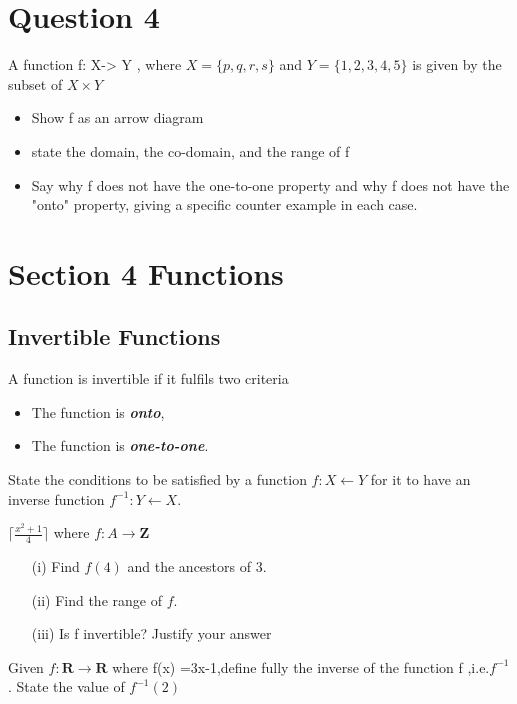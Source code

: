 \documentclass[]{report}
\begin{document}
\begin{enumerate}
\section*{Question 4}

A function f: X-> Y , where $X = \{p,q,r,s\}$ and $Y =\{1,2,3,4,5\}$
is given by the subset of $X \times Y$


\begin{itemize}
\item Show f as an arrow diagram
\item state the domain, the co-domain, and the range of f
\item Say why f does not have the one-to-one property and why f does 
not have the "onto" property, giving a specific counter example in each case.
\end{itemize}


\section{Section 4 Functions}

\subsection{Invertible Functions}
A function is invertible if it fulfils two criteria
\begin{itemize}
\item The function is \textbf{\textit{onto}},
\item The function is \textbf{\textit{one-to-one}}.
\end{itemize}

State the conditions to be satisfied by a function
$f : X \leftarrow Y$ for it to have an inverse function
$f^{-1} : Y \leftarrow X$.

$\lceil \frac{x^2+1}{4} \rceil$
where $f : A \rightarrow \textbf{Z}$
\begin{itemize}
\item[(i)] Find $f(4)$ and the ancestors of 3.
\item[(ii)] Find the range of $f$.
\item[(iii)] Is f invertible? Justify your answer
\end{itemize}

Given $f : \textbf{R} \rightarrow \textbf{R}$ where f(x) =3x-1,define fully
the inverse of the function f ,i.e.$f^{-1}$. 
State the value of $f^{-1}(2)$


\end{enumerate}
\end{document}
